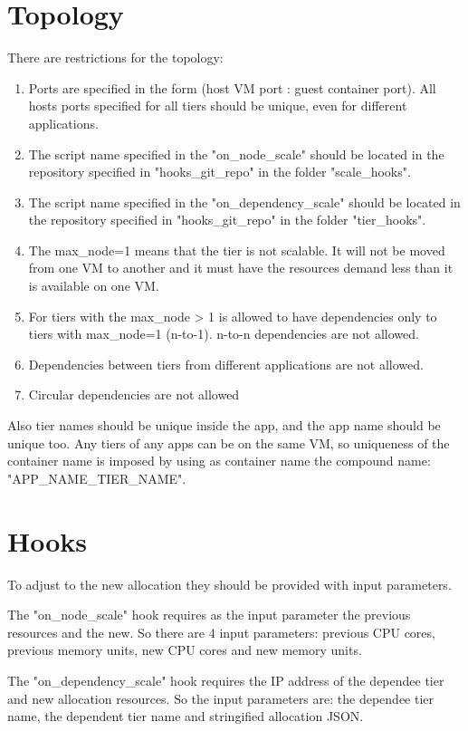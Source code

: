 \section{Topology}
There are restrictions for the topology:
\begin{enumerate}
    \item Ports are specified in the form (host VM port : guest container port). All hosts ports specified for all tiers should be unique, even for different applications.
    \item The script name specified in the "on\_node\_scale" should be located in the repository specified in "hooks\_git\_repo" in the folder "scale\_hooks".
    \item The script name specified in the "on\_dependency\_scale" should be located in the repository specified in "hooks\_git\_repo" in the folder "tier\_hooks".
    \item The max\_node=1 means that the tier is not scalable. It will not be moved from one VM to another and it must have the resources demand less than it is available on one VM.
    \item For tiers with the max\_node \textgreater{} 1 is allowed to have dependencies only to tiers with max\_node=1 (n-to-1). n-to-n dependencies are not allowed.
    \item Dependencies between tiers from different applications are not allowed.
    \item Circular dependencies are not allowed
\end{enumerate}

Also tier names should be unique inside the app, and the app name should be unique too. Any tiers of any apps can be on the same VM, so uniqueness of the container name is imposed by using as container name the compound name: "{APP\_NAME}\_{TIER\_NAME}".

\section{Hooks}
To adjust to the new allocation they should be provided with input parameters.

The "on\_node\_scale" hook requires as the input parameter the previous resources and the new. So there are 4 input parameters: previous CPU cores, previous memory units, new CPU cores and new memory units.

The "on\_dependency\_scale" hook requires the IP address of the dependee tier and new allocation resources. So the input parameters are: the dependee tier name, the dependent tier name and stringified allocation JSON.


